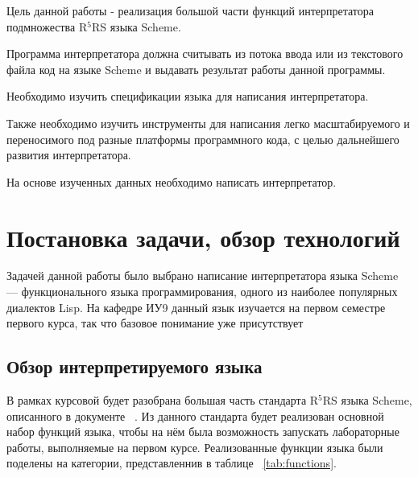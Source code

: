 \documentclass[14pt, russian]{scrartcl}
\begin{document}
Цель данной работы - реализация большой части функций интерпретатора подмножества R$^5$RS языка Scheme.

Программа интерпретатора должна считывать из потока ввода или из текстового файла код на языке Scheme и выдавать результат работы данной программы.

Необходимо изучить спецификации языка для написания интерпретатора.

Также необходимо изучить инструменты для написания легко масштабируемого и переносимого под разные платформы программного кода, с целью дальнейшего развития интерпретатора.

На основе изученных данных необходимо написать интерпретатор.

\section{Постановка задачи, обзор технологий}

Задачей данной работы было выбрано написание интерпретатора языка Scheme --- функционального языка программирования, одного из наиболее популярных диалектов Lisp. На кафедре ИУ9 данный язык изучается на первом семестре первого курса, так что базовое понимание уже присутствует

\subsection{Обзор интерпретируемого языка}

В рамках курсовой будет разобрана большая часть стандарта R$^5$RS языка Scheme, описанного в документе ~\cite{R5rs}. Из данного стандарта будет реализован основной набор функций языка, чтобы на нём была возможность запускать лабораторные работы, выполняемые на первом курсе. Реализованные функции языка были поделены на категории, представленнив в таблице ~\ref{tab:functions}.

\bigskip
\end{document}
